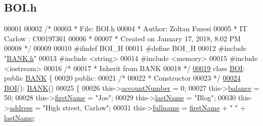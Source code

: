 \hypertarget{_b_o_i_8h_source}{}\subsection{B\+O\+I.\+h}

\begin{DoxyCode}
00001 
00002 \textcolor{comment}{/* }
00003 \textcolor{comment}{ * File:   BOI.h}
00004 \textcolor{comment}{ * Author: Zoltan Fuzesi}
00005 \textcolor{comment}{ * IT Carlow : C00197361}
00006 \textcolor{comment}{ *}
00007 \textcolor{comment}{ * Created on January 17, 2018, 8:02 PM}
00008 \textcolor{comment}{ */}
00009 
00010 \textcolor{preprocessor}{#ifndef BOI\_H}
00011 \textcolor{preprocessor}{#define BOI\_H}
00012 \textcolor{preprocessor}{#include "\hyperlink{_b_a_n_k_8h}{BANK.h}"}
00013 \textcolor{preprocessor}{#include <string>}
00014 \textcolor{preprocessor}{#include <memory>}
00015 \textcolor{preprocessor}{#include <iostream>}
00016 \textcolor{comment}{/*}
00017 \textcolor{comment}{ * Inherit from BANK}
00018 \textcolor{comment}{ */}
\hypertarget{_b_o_i_8h_source.tex_l00019}{}\hyperlink{class_b_o_i}{00019} \textcolor{keyword}{class }\hyperlink{class_b_o_i}{BOI}: \textcolor{keyword}{public} \hyperlink{class_b_a_n_k}{BANK} \{
00020 \textcolor{keyword}{public}:
00021     \textcolor{comment}{/*}
00022 \textcolor{comment}{     * Constructor}
00023 \textcolor{comment}{     */}
\hypertarget{_b_o_i_8h_source.tex_l00024}{}\hyperlink{class_b_o_i_a6af682a5f199a029681f0cb2b8658706_a6af682a5f199a029681f0cb2b8658706}{00024}     \hyperlink{class_b_o_i_a6af682a5f199a029681f0cb2b8658706_a6af682a5f199a029681f0cb2b8658706}{BOI}(): \hyperlink{class_b_a_n_k}{BANK}()
00025     \{
00026         this->\hyperlink{class_b_o_i_a35c9fd6e938eb44ad4e076bc6a736851_a35c9fd6e938eb44ad4e076bc6a736851}{accountNumber} = 0;
00027         this->\hyperlink{class_b_o_i_aa00a3d8baf3420647c40119b7fa4ed6f_aa00a3d8baf3420647c40119b7fa4ed6f}{balance} = 50;
00028         this->\hyperlink{class_b_o_i_a12872fd8c15dbf833f78862b00579ed1_a12872fd8c15dbf833f78862b00579ed1}{firstName} = \textcolor{stringliteral}{"Joe"};
00029         this->\hyperlink{class_b_o_i_ad51bfa6f28816c7f5036447ff809cecf_ad51bfa6f28816c7f5036447ff809cecf}{lastName} = \textcolor{stringliteral}{"Blog"};
00030         this->\hyperlink{class_b_o_i_ab9315fe76fd9f07551f5ae7899d33516_ab9315fe76fd9f07551f5ae7899d33516}{address} = \textcolor{stringliteral}{"High street, Carlow"};
00031         this->\hyperlink{class_b_o_i_a6d7c892a54bb6f7327cdc777081ab5f4_a6d7c892a54bb6f7327cdc777081ab5f4}{fullname} = \hyperlink{class_b_o_i_a12872fd8c15dbf833f78862b00579ed1_a12872fd8c15dbf833f78862b00579ed1}{firstName} + \textcolor{stringliteral}{" "} + \hyperlink{class_b_o_i_ad51bfa6f28816c7f5036447ff809cecf_ad51bfa6f28816c7f5036447ff809cecf}{lastName};

\end{DoxyCode}
